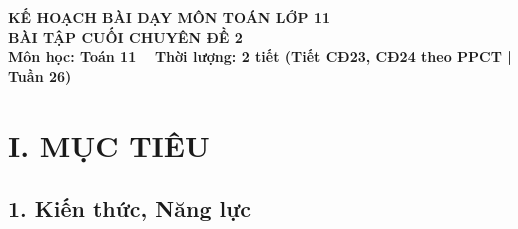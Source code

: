 \documentclass[12pt, a4paper]{article}
\begin{document}
\begin{center}
    {\fontsize{14pt}{17pt}\selectfont \textbf{KẾ HOẠCH BÀI DẠY MÔN TOÁN LỚP 11}}\\[6pt]
    {\fontsize{16pt}{19pt}\selectfont \textbf{BÀI TẬP CUỐI CHUYÊN ĐỀ 2}}\\[4pt]
    {\fontsize{12pt}{15pt}\selectfont \textbf{Môn học: Toán 11} \ \textbar \ \textbf{Thời lượng: 2 tiết (Tiết CĐ23, CĐ24 theo PPCT | Tuần 26)}}
\end{center}

\vspace{5pt}

\section*{I. MỤC TIÊU}

\subsection*{1. Kiến thức, Năng lực}
\end{document}
